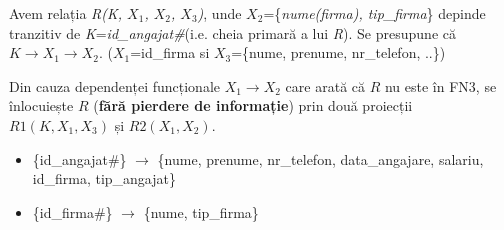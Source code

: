 \documentclass[12pt, a4paper]{article}
\begin{document}
Avem relația \emph{R(K, $X_1$, $X_2$, $X_3$)}, unde $X_2$=\{\emph{nume(firma), tip\_firma}\} depinde tranzitiv de \emph{K}=\emph{id\_angajat\#}(i.e. cheia primară a lui \emph{R}). Se presupune că $K\rightarrow X_1\rightarrow X_2$. ($X_1$=id\_firma si $X_3$=\{nume, prenume, nr\_telefon, ..\})

Din cauza dependenței funcționale $X_1\rightarrow X_2$ care arată că $R$ nu este în FN3, se înlocuiește $R$ (\textbf{fără pierdere de informație}) prin două proiecții $R1(K, X_1, X_3)$ și $R2(X_1, X_2)$.

\begin{itemize}
    \item \{id\_angajat\#\} $\rightarrow$ \{nume, prenume, nr\_telefon, data\_angajare, salariu, id\_firma, tip\_angajat\}
    \item \{id\_firma\#\} $\rightarrow$ \{nume, tip\_firma\}
\end{itemize}

\begin{table}[!htbp]
\begin{center}
\caption{Proiectia \emph{R2-1(K, $X_1$, $X_3$)}}\label{tab6}
\end{center}
\end{table}
\quad \par

\begin{table}[!htbp]
\begin{center}
\caption{Proiectia \emph{R2-2($K_1$, $K_2$)}}\label{tab7}
\end{center}
\end{table}
\quad \par
\end{document}

